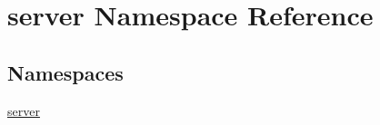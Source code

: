 \hypertarget{namespaceserver}{}\section{server Namespace Reference}
\label{namespaceserver}
\subsection*{Namespaces}
\begin{DoxyCompactItemize}
\item 
 \mbox{\hyperlink{namespaceserver_1_1server}{server}}
\end{DoxyCompactItemize}
